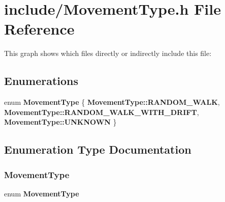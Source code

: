 \section{include/\+Movement\+Type.h File Reference}
\label{_movement_type_8h}
This graph shows which files directly or indirectly include this file\+:
\subsection*{Enumerations}
\begin{DoxyCompactItemize}
\item 
enum \textbf{ Movement\+Type} \{ \textbf{ Movement\+Type\+::\+R\+A\+N\+D\+O\+M\+\_\+\+W\+A\+LK}, 
\textbf{ Movement\+Type\+::\+R\+A\+N\+D\+O\+M\+\_\+\+W\+A\+L\+K\+\_\+\+W\+I\+T\+H\+\_\+\+D\+R\+I\+FT}, 
\textbf{ Movement\+Type\+::\+U\+N\+K\+N\+O\+WN}
 \}
\end{DoxyCompactItemize}


\subsection{Enumeration Type Documentation}
\mbox{\label{_movement_type_8h_a8a93b61bc797a7d1907f42796a252493}} 
\subsubsection{Movement\+Type}
{\footnotesize\ttfamily enum \textbf{ Movement\+Type}\hspace{0.3cm}{\ttfamily [strong]}}

